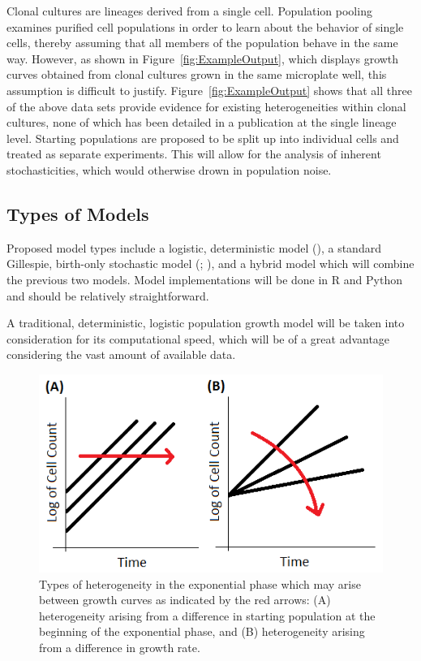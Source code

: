 \documentclass{bioinfo}
\begin{document}
Clonal cultures are lineages derived from a single cell. Population pooling examines purified cell populations in order to learn about the behavior of single cells, thereby assuming that all members of the population behave in the same way. However, as shown in Figure~\ref{fig:ExampleOutput}, which displays growth curves obtained from clonal cultures grown in the same microplate well, this assumption is difficult to justify. Figure~\ref{fig:ExampleOutput} shows that all three of the above data sets provide evidence for existing heterogeneities within clonal cultures, none of which has been detailed in a publication at the single lineage level. Starting populations are proposed to be split up into individual cells and treated as separate experiments. This will allow for the analysis of inherent stochasticities, which would otherwise drown in population noise. 

\subsection{Types of Models}

Proposed model types include a logistic, deterministic model (\citealp{Verhulst45}), a standard Gillespie, birth-only stochastic model (\citealp{Bailey64}; \citealp{Gillespie77}), and a hybrid model which will combine the previous two models. Model implementations will be done in R and Python and should be relatively straightforward. 

A traditional, deterministic, logistic population growth model will be taken into consideration for its computational speed, which will be of a great advantage considering the vast amount of available data.

\vspace{-1em}
\begin{figure}[H]
\centering
\includegraphics[width=0.7\linewidth]{HeterogeneityTypes.png}
\caption{Types of heterogeneity in the exponential phase which may arise between growth curves as indicated by the red arrows: (A) heterogeneity arising from a difference in starting population at the beginning of the exponential phase, and (B) heterogeneity arising from a difference in growth rate.}
\label{fig:HeteroTypes}
\vspace{-2em}
\end{figure}
\vspace{-1em}
\end{document}
